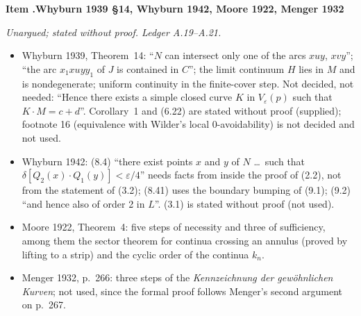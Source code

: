 \documentclass[11pt]{article}
\newcounter{defect}
\newenvironment{defect}[4]{%
  \par\addvspace{10pt}\refstepcounter{defect}%
  \noindent\textbf{Item \thedefect.\enspace #1}\par\nopagebreak
  \noindent\textit{#2}\par\nopagebreak\smallskip}{\par\addvspace{6pt}}
\begin{document}
\begin{defect}{Whyburn 1939 \S14, Whyburn 1942, Moore 1922, Menger 1932}{Unargued; stated without
proof. Ledger A.19--A.21.}{0}{0}\label{it:un-why}
\begin{itemize}
\item Whyburn 1939, Theorem~14: ``$N$ can intersect only one of the arcs $xuy$, $xvy$''; ``the arc
  $x_1xuyy_1$ of $J$ is contained in $C$''; the limit continuum $H$ lies in $M$ and is
  nondegenerate; uniform continuity in the finite-cover step. Not decided, not needed: ``Hence
  there exists a simple closed curve $K$ in $V_\varepsilon(p)$ such that $K\cdot M=c+d$''. Corollary~1
  and (6.22) are stated without proof (supplied); footnote 16 (equivalence with Wilder's local
  0-avoidability) is not decided and not used.
\item Whyburn 1942: (8.4) ``there exist points $x$ and $y$ of $N$ \ldots\ such that
  $\delta[Q_2(x)\cdot Q_1(y)]<\varepsilon/4$'' needs facts from inside the proof of (2.2), not from
  the statement of (3.2); (8.41) uses the boundary bumping of (9.1); (9.2) ``and hence also of
  order 2 in $L$''. (3.1) is stated without proof (not used).
\item Moore 1922, Theorem~4: five steps of necessity and three of sufficiency, among them the sector
  theorem for continua crossing an annulus (proved by lifting to a strip) and the cyclic order of
  the continua $k_n$.
\item Menger 1932, p.~266: three steps of the \emph{Kennzeichnung der gewöhnlichen Kurven}; not
  used, since the formal proof follows Menger's second argument on p.~267.
\end{itemize}
\end{defect}
\end{document}
